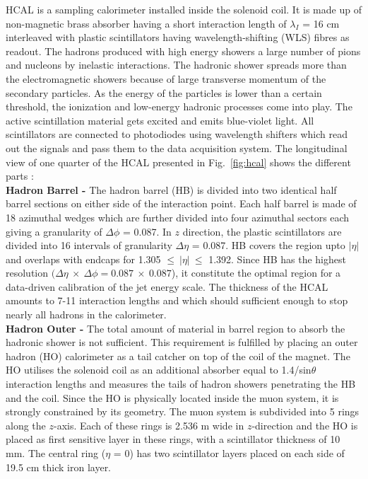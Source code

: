HCAL is a sampling calorimeter installed inside the solenoid coil. It is made up of non-magnetic brass absorber having a short interaction length of $\lambda_I$ = 16 cm interleaved with plastic scintillators having wavelength-shifting (WLS) fibres as readout. The hadrons produced with high energy showers a large number of pions and nucleons by inelastic interactions. The hadronic shower spreads more than the electromagnetic showers because of large transverse momentum of the secondary particles. As the energy of the particles is lower than a certain threshold, the ionization and low-energy hadronic processes come into play. The active scintillation material gets excited and emits blue-violet light. All scintillators are connected to photodiodes using wavelength shifters which read out the signals and pass them to the data acquisition system. The longitudinal view of one quarter of the HCAL presented in Fig.~\ref{fig:hcal} shows the different parts : \\\newline
{\bf Hadron Barrel -} The hadron barrel (HB) is divided into two identical half barrel sections on either side of the interaction point. Each half barrel is made of 18 azimuthal wedges which are further divided into four azimuthal sectors each giving a granularity of $\Delta\phi$ = 0.087. In $z$ direction, the plastic scintillators are divided into 16 intervals of granularity $\Delta\eta$ = 0.087. HB covers the region upto $|\eta|$  and overlaps with endcaps for 1.305 $\leq~|\eta|~\leq$ 1.392. Since HB has the highest resolution $(\Delta\eta~\times~\Delta\phi = 0.087~\times~0.087$), it constitute the optimal region for a data-driven calibration of the jet energy scale. The thickness of the HCAL amounts to 7-11 interaction lengths and which should sufficient enough to stop nearly all hadrons in the calorimeter.\\\newline
{\bf Hadron Outer -} The total amount of material in barrel region to absorb the hadronic shower is not sufficient. This requirement is fulfilled by placing an outer hadron (HO) calorimeter as a tail catcher on top of the coil of the magnet. The HO utilises the solenoid coil as an additional absorber equal to 1.4/sin$\theta$ interaction lengths and measures the tails of hadron showers penetrating the HB and the coil. Since the HO is physically located inside the muon system, it is strongly constrained by its geometry. The muon system is subdivided into 5 rings along the $z$-axis. Each of these rings is 2.536 m wide in $z$-direction and the HO is placed as first sensitive layer in these rings, with a scintillator thickness of 10 mm. The central ring ($\eta$ = 0) has two scintillator layers placed on each side of 19.5 cm thick iron layer.\\ \newline

